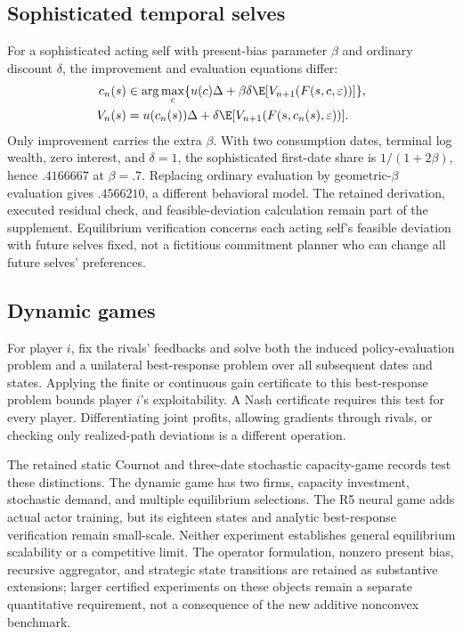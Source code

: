 \subsection{Sophisticated temporal selves}
For a sophisticated acting self with present-bias parameter $\beta$ and ordinary discount $\delta$, the improvement and evaluation equations differ:
\begin{align}
 c_n(s)&\in\arg\max_c\{u(c)\Delta+\beta\delta\E[V_{n+1}(F(s,c,\varepsilon))]\},\\
 V_n(s)&=u(c_n(s))\Delta+\delta\E[V_{n+1}(F(s,c_n(s),\varepsilon))].\label{r8:selves}
\end{align}
Only improvement carries the extra $\beta$. With two consumption dates, terminal log wealth, zero interest, and $\delta=1$, the sophisticated first-date share is $1/(1+2\beta)$, hence $.4166667$ at $\beta=.7$. Replacing ordinary evaluation by geometric-$\beta$ evaluation gives $.4566210$, a different behavioral model. The retained derivation, executed residual check, and feasible-deviation calculation remain part of the supplement. Equilibrium verification concerns each acting self's feasible deviation with future selves fixed, not a fictitious commitment planner who can change all future selves' preferences.

\subsection{Dynamic games}
For player $i$, fix the rivals' feedbacks and solve both the induced policy-evaluation problem and a unilateral best-response problem over all subsequent dates and states. Applying the finite or continuous gain certificate to this best-response problem bounds player $i$'s exploitability. A Nash certificate requires this test for every player. Differentiating joint profits, allowing gradients through rivals, or checking only realized-path deviations is a different operation.

The retained static Cournot and three-date stochastic capacity-game records test these distinctions. The dynamic game has two firms, capacity investment, stochastic demand, and multiple equilibrium selections. The R5 neural game adds actual actor training, but its eighteen states and analytic best-response verification remain small-scale. Neither experiment establishes general equilibrium scalability or a competitive limit. The operator formulation, nonzero present bias, recursive aggregator, and strategic state transitions are retained as substantive extensions; larger certified experiments on these objects remain a separate quantitative requirement, not a consequence of the new additive nonconvex benchmark.

